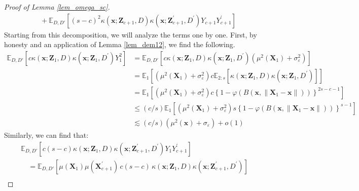 \documentclass[letterpaper,10pt]{article}
\numberwithin{equation}{section}
\numberwithin{thm}{section}
\numberwithin{lem}{section}
\numberwithin{cor}{section}
\newcommand{\E}{\mathbb{E}}
\newcommand{\1}{\mathbbm{1}}
\begin{document}
\begin{proof}[Proof of Lemma \ref{lem_omega_sc}]
\begin{equation}
\begin{aligned}
			 & \quad + \E_{D, D'}\left[(s-c)^2 \kappa\left(\mathbf{x}; \mathbf{Z}_{c+1}, D\right)\kappa\left(\mathbf{x}; \mathbf{Z}_{c+1}^{\prime}, D^{\prime}\right)Y_{c+1}Y_{c+1}^{\prime}\right]
		\end{aligned}
	\end{equation}
	Starting from this decomposition, we will analyze the terms one by one.
	First, by honesty and an application of Lemma \ref{lem_dem12}, we find the following.
	\begin{equation}
		\begin{aligned}
			\E_{D, D'}\left[c\kappa\left(\mathbf{x}; \mathbf{Z}_{1}, D\right)\kappa\left(\mathbf{x}; \mathbf{Z}_{1}, D^{\prime}\right)Y_{1}^{2}\right]
			 & = \E_{D, D'}\left[c\kappa\left(\mathbf{x}; \mathbf{Z}_{1}, D\right)\kappa\left(\mathbf{x}; \mathbf{Z}_{1}, D^{\prime}\right)\left(\mu^2(\mathbf{X}_1) + \sigma_{\varepsilon}^{2}\right)\right]                   \\
			 & = \E_{1}\left[\left(\mu^2(\mathbf{X}_1) + \sigma_{\varepsilon}^{2}\right) c\E_{2:s}\left[\kappa\left(\mathbf{x}; \mathbf{Z}_{1}, D\right)\kappa\left(\mathbf{x}; \mathbf{Z}_{1}, D^{\prime}\right)\right]\right] \\
			 & = \E_{1}\left[\left(\mu^2(\mathbf{X}_1) + \sigma_{\varepsilon}^{2}\right) c\left\{1 - \varphi\left(B\left(\mathbf{x}, \|\mathbf{X}_1 - \mathbf{x}\|\right)\right)\right\}^{2s-c-1}\right]                        \\
			 & \leq (c/s) \E_{1}\left[\left(\mu^2(\mathbf{X}_1) + \sigma_{\varepsilon}^{2}\right) s\left\{1 - \varphi\left(B\left(\mathbf{x}, \|\mathbf{X}_1 - \mathbf{x}\|\right)\right)\right\}^{s-1}\right]                  \\
			 & \lesssim (c/s)\left(\mu^2(\mathbf{x}) + \sigma_{\varepsilon}\right) + o(1)
		\end{aligned}
	\end{equation}
	Similarly, we can find that:
	\begin{equation}
		\begin{aligned}
			 & \E_{D, D'}\left[c(s-c) \kappa\left(\mathbf{x}; \mathbf{Z}_{1}, D\right)\kappa\left(\mathbf{x}; \mathbf{Z}_{c+1}^{\prime}, D^{\prime}\right)Y_{1}Y_{c+1}^{\prime}\right]                                          \\
			 & \quad = \E_{D, D'}\left[\mu(\mathbf{X}_1)\mu(\mathbf{X}_{c+1}^{\prime}) \, c(s-c) \, \kappa\left(\mathbf{x}; \mathbf{Z}_{1}, D\right)\kappa\left(\mathbf{x}; \mathbf{Z}_{c+1}^{\prime}, D^{\prime}\right)\right] \\

\end{aligned}
\end{equation}
\end{proof}
\end{document}
